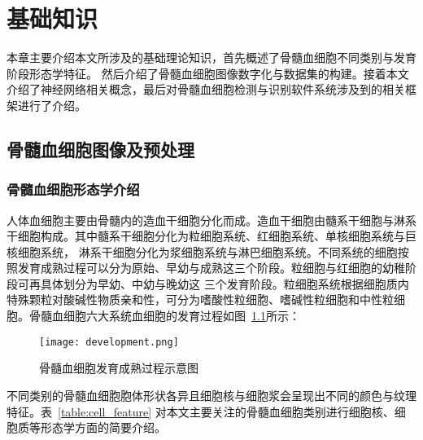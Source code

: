 
\chapter{基础知识}
本章主要介绍本文所涉及的基础理论知识，首先概述了骨髓血细胞不同类别与发育阶段形态学特征。
然后介绍了骨髓血细胞图像数字化与数据集的构建。接着本文介绍了神经网络相关概念，最后对骨髓血细胞检测与识别软件系统涉及到的相关框架进行了介绍。
\section{骨髓血细胞图像及预处理}
\subsection{骨髓血细胞形态学介绍}
人体血细胞主要由骨髓内的造血干细胞分化而成。造血干细胞由髓系干细胞与淋系干细胞构成。其中髓系干细胞分化为粒细胞系统、红细胞系统、单核细胞系统与巨核细胞系统，
淋系干细胞分化为浆细胞系统与淋巴细胞系统。不同系统的细胞按照发育成熟过程可以分为原始、早幼与成熟这三个阶段。粒细胞与红细胞的幼稚阶段可再具体划分为早幼、中幼与晚幼这
三个发育阶段。粒细胞系统根据细胞质内特殊颗粒对酸碱性物质亲和性，可分为嗜酸性粒细胞、嗜碱性粒细胞和中性粒细胞。骨髓血细胞六大系统血细胞的发育过程如图~\ref{fig:development}所示\cite{cong2002}：
\begin{figure}[htbp]
  \centering
  \texttt{[image: development.png]}
  \caption{骨髓血细胞发育成熟过程示意图}
  \label{fig:development}
\end{figure}

不同类别的骨髓血细胞胞体形状各异且细胞核与细胞浆会呈现出不同的颜色与纹理特征。表~\ref{table:cell_feature}
对本文主要关注的骨髓血细胞类别进行细胞核、细胞质等形态学方面的简要介绍。

